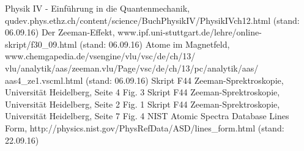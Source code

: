 



\begin{thebibliography}{1}
Physik IV - Einführung in die Quantenmechanik, qudev.phys.ethz.ch/content/science/BuchPhysikIV/PhysikIVch12.html (stand: 06.09.16)
Der Zeeman-Effekt, www.ipf.uni-stuttgart.de/lehre/online-skript/f30\_09.html (stand: 06.09.16)
Atome im Magnetfeld, www.chemgapedia.de/vsengine/vlu/vsc/de/ch/13/ vlu/analytik/aas/zeeman.vlu/Page/vsc/de/ch/13/pc/analytik/aas/ aas4\_ze1.vscml.html (stand: 06.09.16)
Skript F44 Zeeman-Sprektroskopie, Universität Heidelberg, Seite 4 Fig. 3
Skript F44 Zeeman-Sprektroskopie, Universität Heidelberg, Seite 2 Fig. 1
Skript F44 Zeeman-Sprektroskopie, Universität Heidelberg, Seite 7 Fig. 4
NIST Atomic Spectra Database Lines Form, http://physics.nist.gov/PhysRefData/ASD/lines\_form.html (stand: 22.09.16)

\end{thebibliography}




